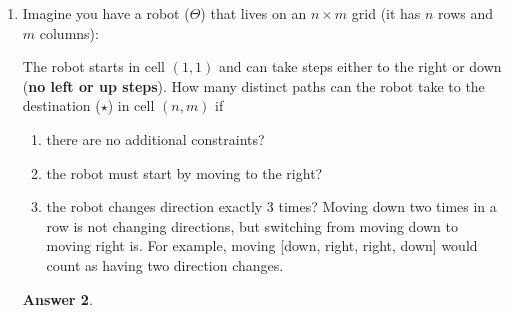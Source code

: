 \documentclass[12pt]{article}
\renewcommand{\(}{\left(}
\renewcommand{\)}{\right)}
\theoremstyle{definition}
\newtheorem*{answer}{Answer}
\begin{document}
\begin{enumerate}
\begin{enumerate}[label=\alph*.]
    \end{enumerate}

    \begin{shaded}
    \begin{answer}

    \end{answer}
    \end{shaded}
    \newpage


\item Imagine you have a robot ($\Theta$) that lives on an $n \times m$ grid (it has $n$ rows and $m$ columns):
%
\begin{center}
\end{center}
%
The robot starts in cell $(1, 1)$ and can take steps either to the right or down (\textbf{no left or up
steps}). How many distinct paths can the robot take to the destination ($\star$) in cell $(n, m)$ if
    \begin{enumerate}[label=\alph*.]

    \item there are no additional constraints?
    \item the robot must start by moving to the right?
    \item the robot changes direction exactly 3 times? Moving down two times in a
row is not changing directions, but switching from moving down to moving right is. 
For example, moving [down, right, right, down] would count as having two direction changes.

    \end{enumerate}

    \begin{shaded}
    \begin{answer}


\end{answer}
\end{shaded}
\end{enumerate}
\end{document}
